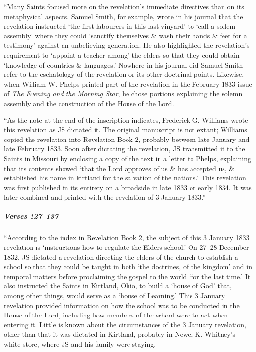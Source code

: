 				``Many Saints focused more on the revelation's immediate directives than on its metaphysical aspects. Samuel Smith, for example, wrote in his journal that the revelation instructed `the first labourers in this last vinyard' to `call a sollem assembly' where they could `sanctify themselves \& wash their hands \& feet for a testimony' against an unbelieving generation. He also highlighted the revelation's requirement to `appoint a teacher among' the elders so that they could obtain `knowledge of countries \& languages.' Nowhere in his journal did Samuel Smith refer to the eschatology of the revelation or its other doctrinal points. Likewise, when William W. Phelps printed part of the revelation in the February 1833 issue of \textit{The Evening and the Morning Star}, he chose portions explaining the solemn assembly and the construction of the House of the Lord.

				``As the note at the end of the inscription indicates, Frederick G. Williams wrote this revelation as JS dictated it. The original manuscript is not extant; Williams copied the revelation into Revelation Book 2, probably between late January and late February 1833. Soon after dictating the revelation, JS transmitted it to the Saints in Missouri by enclosing a copy of the text in a letter to Phelps, explaining that its contents showed `that the Lord approves of us \& has accepted us, \& established his name in kirtland for the salvation of the nations.' This revelation was first published in its entirety on a broadside in late 1833 or early 1834. It was later combined and printed with the revelation of 3 January 1833.''

			\subparagraph{Verses 127--137}
			
				``According to the index in Revelation Book 2, the subject of this 3 January 1833 revelation is `instructions how to regulate the Elders school.' On 27--28 December 1832, JS dictated a revelation directing the elders of the church to establish a school so that they could be taught in both `the doctrines, of the kingdom' and in temporal matters before proclaiming the gospel to the world `for the last time.' It also instructed the Saints in Kirtland, Ohio, to build a `house of God' that, among other things, would serve as a `house of Learning.' This 3 January revelation provided information on how the school was to be conducted in the House of the Lord, including how members of the school were to act when entering it. Little is known about the circumstances of the 3 January revelation, other than that it was dictated in Kirtland, probably in Newel K. Whitney's white store, where JS and his family were staying.
				
